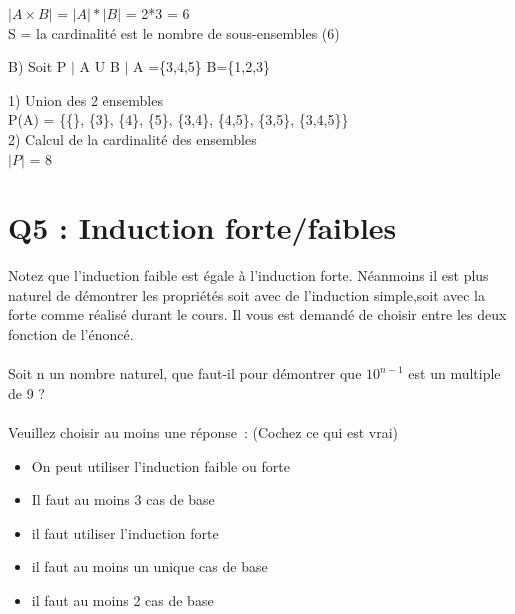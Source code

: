       ${|A\times B|}$ = ${|A|}*{|B|}$ = 2*3 = 6 \\

      S = la cardinalité est le nombre de sous-ensembles (6)\\

  \vspace{8mm} %

  B) Soit P $|$ A U B $|$ A =\{3,4,5\} B=\{1,2,3\} \\

  \vspace{5mm} %

  1) Union des 2 ensembles \\

  P(A) = \{\{\}, \{3\}, \{4\}, \{5\}, \{3,4\}, \{4,5\}, \{3,5\}, \{3,4,5\}\} \\

  \vspace{4mm} %
  2) Calcul de la cardinalité des ensembles \\

  $|P|$ = 8 \\

\newpage
\section{Q5 : Induction forte/faibles}

\vspace{5mm} %

Notez que l’induction faible est égale à l’induction forte. Néanmoins il est plus naturel de démontrer les propriétés soit avec de l’induction simple,soit avec la forte comme réalisé durant le cours. Il vous est demandé de choisir entre les deux fonction de l’énoncé.\\ \\
Soit n un nombre naturel, que faut-il pour démontrer que $10^{n-1}$ est un multiple de 9 ? \\ \\
Veuillez choisir au moins une réponse : (Cochez ce qui est vrai)\\

\begin{itemize}[label=$\square$]
\item On peut utiliser l’induction faible ou forte
\item Il faut au moins 3 cas de base
\item il faut utiliser l’induction forte
\item il faut au moins un unique cas de base
\item il faut au moins 2 cas de base
\end{itemize}

